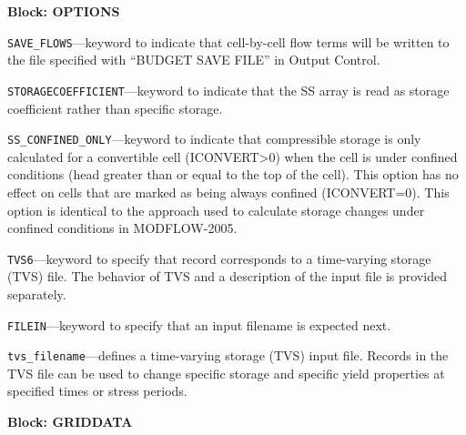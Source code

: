 
\item \textbf{Block: OPTIONS}

\begin{description}
\item \texttt{SAVE\_FLOWS}---keyword to indicate that cell-by-cell flow terms will be written to the file specified with ``BUDGET SAVE FILE'' in Output Control.

\item \texttt{STORAGECOEFFICIENT}---keyword to indicate that the SS array is read as storage coefficient rather than specific storage.

\item \texttt{SS\_CONFINED\_ONLY}---keyword to indicate that compressible storage is only calculated for a convertible cell (ICONVERT>0) when the cell is under confined conditions (head greater than or equal to the top of the cell). This option has no effect on cells that are marked as being always confined (ICONVERT=0).  This option is identical to the approach used to calculate storage changes under confined conditions in MODFLOW-2005.

\item \texttt{TVS6}---keyword to specify that record corresponds to a time-varying storage (TVS) file.  The behavior of TVS and a description of the input file is provided separately.

\item \texttt{FILEIN}---keyword to specify that an input filename is expected next.

\item \texttt{tvs\_filename}---defines a time-varying storage (TVS) input file.  Records in the TVS file can be used to change specific storage and specific yield properties at specified times or stress periods.

\end{description}
\item \textbf{Block: GRIDDATA}

